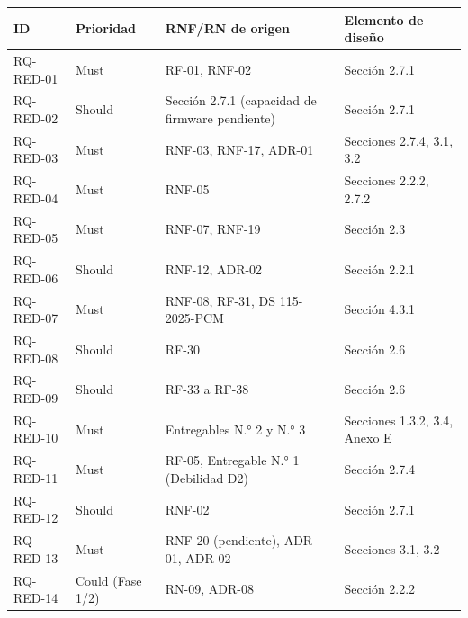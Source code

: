\documentclass[11pt,a4paper]{article}
\begin{document}
{\small
\begin{longtable}[]{@{}
  >{\raggedright\arraybackslash}p{}
  >{\raggedright\arraybackslash}p{}
  >{\raggedright\arraybackslash}p{}
  >{\raggedright\arraybackslash}p{}@{}}
\toprule\noalign{}
\begin{minipage}[b]{\linewidth}\raggedright
ID
\end{minipage} & \begin{minipage}[b]{\linewidth}\raggedright
Prioridad
\end{minipage} & \begin{minipage}[b]{\linewidth}\raggedright
RNF/RN de origen
\end{minipage} & \begin{minipage}[b]{\linewidth}\raggedright
Elemento de diseño
\end{minipage} \\
\midrule\noalign{}
\endhead
\bottomrule\noalign{}
\endlastfoot
RQ-RED-01 & Must & RF-01, RNF-02 & Sección 2.7.1 \\
RQ-RED-02 & Should & Sección 2.7.1 (capacidad de firmware pendiente) & Sección 2.7.1 \\
RQ-RED-03 & Must & RNF-03, RNF-17, ADR-01 & Secciones 2.7.4, 3.1, 3.2 \\
RQ-RED-04 & Must & RNF-05 & Secciones 2.2.2, 2.7.2 \\
RQ-RED-05 & Must & RNF-07, RNF-19 & Sección 2.3 \\
RQ-RED-06 & Should & RNF-12, ADR-02 & Sección 2.2.1 \\
RQ-RED-07 & Must & RNF-08, RF-31, DS 115-2025-PCM & Sección 4.3.1 \\
RQ-RED-08 & Should & RF-30 & Sección 2.6 \\
RQ-RED-09 & Should & RF-33 a RF-38 & Sección 2.6 \\
RQ-RED-10 & Must & Entregables N.° 2 y N.° 3 & Secciones 1.3.2, 3.4, Anexo E \\
RQ-RED-11 & Must & RF-05, Entregable N.° 1 (Debilidad D2) & Sección 2.7.4 \\
RQ-RED-12 & Should & RNF-02 & Sección 2.7.1 \\
RQ-RED-13 & Must & RNF-20 (pendiente), ADR-01, ADR-02 & Secciones 3.1, 3.2 \\
RQ-RED-14 & Could (Fase 1/2) & RN-09, ADR-08 & Sección 2.2.2 \\
\end{longtable}
}
\end{document}
